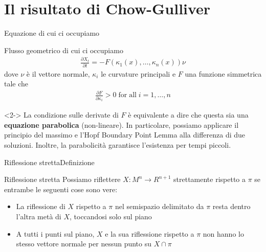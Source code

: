 \section{Il risultato di Chow-Gulliver}


\begin{frame}{Equazione di cui ci occupiamo}{}
	\begin{block}{Flusso geometrico di cui ci occupiamo}
		\begin{align*}
			\frac{\partial X_t}{\partial t} = - F(\kappa_1(x), \dots , \kappa_n(x)) \nu
		\end{align*}
		dove $\nu$ è il vettore normale, $\kappa_i$ le curvature principali e $F$ una funzione simmetrica tale che 
		\begin{align*}
			\frac{\partial F}{\partial \kappa_i} > 0 \mathrm{\; for \; all } \; i=1,\dots, n
		\end{align*}
	\end{block}
	\begin{block}{}<2->
		La condizione sulle derivate di $F$ è equivalente a dire che questa sia una \textbf{equazione parabolica} (non-lineare). In particolare, possiamo applicare il principio del massimo e l'Hopf Boundary Point Lemma alla differenza di due soluzioni. Inoltre, la parabolicità garantisce l'esistenza per tempi piccoli.
	\end{block}
\end{frame}



\begin{frame}{Riflessione stretta}{Definizione}
	\begin{block}{Riflessione stretta}
		 Possiamo riflettere $X : M^n \rightarrow R^{n+1}$ strettamente rispetto a $\pi$ se entrambe le seguenti cose sono vere:
		 \begin{itemize}
		 	\item La riflessione di $X$ rispetto a $\pi$ nel semispazio delimitato da $\pi$ resta dentro l'altra metà di $X$, toccandosi solo sul piano
		 	\item A tutti i punti sul piano, $X$ e la sua riflessione rispetto a $\pi$ non hanno lo stesso vettore normale per nessun punto su $X\cap\pi$
		 \end{itemize}
	\end{block}
\end{frame}


